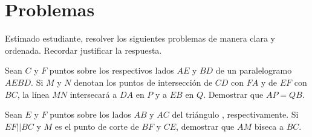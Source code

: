 \section{\large Problemas}

Estimado estudiante, resolver los siguientes problemas de manera clara y ordenada.
Recordar justificar la respuesta.


\begin{section-problem.tcb}{}{}
    Sean $C$ y $F$ puntos sobre los respectivos lados $AE$ y $BD$ de un paralelogramo $AEBD$.
    Si $M$ y $N$ denotan los puntos de intersección de $CD$ con $FA$ y de $EF$ con $BC$, la línea $MN$ intersecará a $DA$ en $P$ y a $EB$ en $Q$.
    Demostrar que $AP = QB$.
\end{section-problem.tcb}

\begin{section-problem.tcb}{}{}
    Sean $E$ y $F$ puntos sobre los lados $AB$ y $AC$ del triángulo , respectivamente.
    Si $EF || BC$ y $M$ es el punto de corte de $BF$ y $CE$, demostrar que $AM$ biseca a $BC$.
\end{section-problem.tcb}


